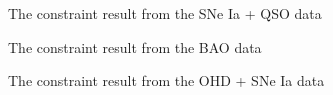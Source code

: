 \documentclass[twocolumn]{aastex631}
\begin{document}
   \begin{figure}[htbp]
      \centering
      \caption{The constraint result from the SNe Ia + QSO data}
   \end{figure}

   \begin{figure}[htbp]
      \centering
      \caption{The constraint result from the BAO data}
   \end{figure}

   \begin{figure}[htbp]
      \centering
      \caption{The constraint result from the OHD + SNe Ia data}
   \end{figure}
\end{document}
